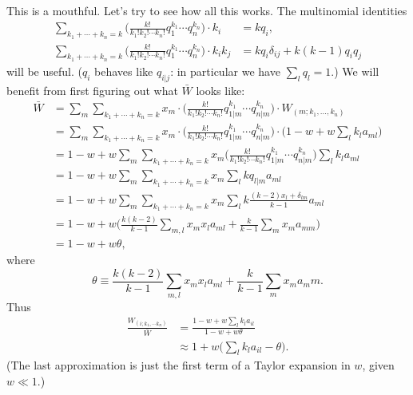\documentclass[14pt, justified]{tufte-handout}
\begin{document}
This is a mouthful.
Let's try to see how all this works.
The multinomial identities
\begin{equation}
    \begin{split}
        \sum_{k_1 + \cdots + k_n = k}\Big( \frac{k!}{k_1! k_2! \cdots k_n!} q_1^{k_1} \cdots q_n^{k_n} \Big) \cdot k_i &= kq_i,
        \\
        \sum_{k_1 + \cdots + k_n = k}\Big( \frac{k!}{k_1! k_2! \cdots k_n!} q_1^{k_1} \cdots q_n^{k_n} \Big) \cdot k_i k_j &= kq_i\delta_{ij} + k(k-1)q_i q_j
    \end{split}
\end{equation}
will be useful.
($q_i$ behaves like $q_{i|j}$: in particular we have $\sum_l q_l = 1$.)
We will benefit from first figuring out what $\bar{W}$ looks like:
\begin{equation}
    \begin{split}
        \bar{W} &= \sum_m \sum_{k_1 + \cdots + k_n = k} x_m \cdot \Big( \frac{k!}{k_1! k_2! \cdots k_n!} q_{1|m}^{k_1} \cdots q_{n|m}^{k_n} \Big) \cdot W_{(m; k_1, \ldots ,k_n)}
        \\
        &= \sum_m \sum_{k_1 + \cdots + k_n = k} x_m \cdot \Big( \frac{k!}{k_1! k_2! \cdots k_n!} q_{1|m}^{k_1} \cdots q_{n|m}^{k_n} \Big) \cdot \Big( 1 - w + w\sum_l k_l a_{ml} \Big)
        \\
        &= 1 - w + w\sum_m \sum_{k_1 + \cdots + k_n = k} x_m \Big( \frac{k!}{k_1! k_2! \cdots k_n!} q_{1|m}^{k_1} \cdots q_{n|m}^{k_n} \Big) \sum_l k_l a_{ml}
        \\
        &= 1 - w + w\sum_m \sum_{k_1 + \cdots + k_n = k} x_m \sum_l k q_{l|m} a_{ml}
        \\
        &= 1 - w + w\sum_m \sum_{k_1 + \cdots + k_n = k} x_m \sum_l k \frac{(k-2)x_l + \delta_{lm}}{k-1} a_{ml}
        \\
        &= 1 - w + w \Big(\frac{k(k-2)}{k-1} \sum_{m,l} x_m x_l a_{ml} + \frac{k}{k-1} \sum_m x_m a_{mm} \Big)
        \\
        &= 1 - w + w\theta,
    \end{split}
\end{equation}
where
\begin{equation}
    \theta \equiv \frac{k(k-2)}{k-1} \sum_{m,l} x_m x_l a_{ml} + \frac{k}{k-1} \sum_m x_m a_mm.
\end{equation}
Thus
\begin{equation}
    \begin{split}
        \frac{W_{(i; k_1, \cdots k_n)}}{\bar{W}} & = \frac{1 - w + w\sum_l k_l a_{il}}{1 - w + w\theta}
        \\
        & \approx 1 + w \Big( \sum_l k_l a_{il} - \theta \Big).
    \end{split}
\end{equation}
(The last approximation is just the first term of a Taylor expansion in $w$, given $w \ll 1$.)
\end{document}

